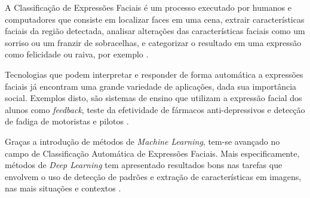 A Classificação de Expressões Faciais é um processo executado por humanos e computadores que consiste em localizar faces em uma cena, extrair características faciais da região detectada, analisar alterações das características faciais como um sorriso ou um franzir de sobracelhas, e categorizar o resultado em uma expressão como felicidade ou raiva, por exemplo \cite{Pantic2009fea}.

Tecnologias que podem interpretar e responder de forma automática a expressões faciais já encontram uma grande variedade de aplicações, dada sua importância social. Exemplos disto, são sistemas de ensino que utilizam a expressão facial dos alunos como \textit{feedback}, teste da efetividade de fármacos anti-depressivos e detecção de fadiga de motoristas e pilotos \cite{Fasel2003}.

Graças a introdução de métodos de \textit{Machine Learning}, tem-se  avançado no campo de Classificação Automática de Expressões Faciais. Mais especificamente, métodos de \textit{Deep Learning} tem apresentado resultados bons nas tarefas que envolvem o uso de detecção de padrões e extração de características em imagens, nas mais situações e contextos \cite{whitehill2013automatic}.

